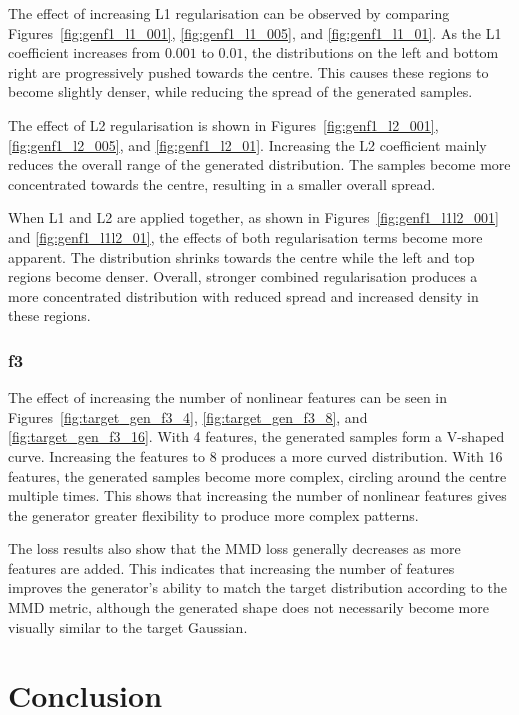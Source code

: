 \documentclass[conference,a4paper]{IEEEtran}
\begin{document}
The effect of increasing L1 regularisation can be observed by comparing Figures~\ref{fig:genf1_l1_001}, \ref{fig:genf1_l1_005}, and \ref{fig:genf1_l1_01}. As the L1 coefficient increases from \(0.001\) to \(0.01\), the distributions on the left and bottom right are progressively pushed towards the centre. This causes these regions to become slightly denser, while reducing the spread of the generated samples.

The effect of L2 regularisation is shown in Figures~\ref{fig:genf1_l2_001}, \ref{fig:genf1_l2_005}, and \ref{fig:genf1_l2_01}. Increasing the L2 coefficient mainly reduces the overall range of the generated distribution. The samples become more concentrated towards the centre, resulting in a smaller overall spread.

When L1 and L2 are applied together, as shown in Figures~\ref{fig:genf1_l1l2_001} and \ref{fig:genf1_l1l2_01}, the effects of both regularisation terms become more apparent. The distribution shrinks towards the centre while the left and top regions become denser. Overall, stronger combined regularisation produces a more concentrated distribution with reduced spread and increased density in these regions.

\subsubsection{f3}

The effect of increasing the number of nonlinear features can be seen in Figures~\ref{fig:target_gen_f3_4}, \ref{fig:target_gen_f3_8}, and \ref{fig:target_gen_f3_16}. With 4 features, the generated samples form a V-shaped curve. Increasing the features to 8 produces a more curved distribution. With 16 features, the generated samples become more complex, circling around the centre multiple times. This shows that increasing the number of nonlinear features gives the generator greater flexibility to produce more complex patterns.

The loss results also show that the MMD loss generally decreases as more features are added. This indicates that increasing the number of features improves the generator's ability to match the target distribution according to the MMD metric, although the generated shape does not necessarily become more visually similar to the target Gaussian.
\section{Conclusion}
\end{document}
